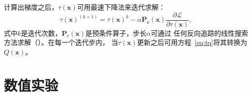 计算出梯度之后，$\tau(\mathbf{x})$可用最速下降法来迭代求解：
\begin{equation}
    \tau(\mathbf{x})^{(k+1)}=\tau(\mathbf{x})^k-\alpha \mathbf{P_c}(\mathbf{x})
    \frac{\partial \mathcal{L}}{\partial \tau(\mathbf{x})},
\end{equation}
式中$k$是迭代次数，$\mathbf{P}_c(\mathbf{x})$是预条件算子，步长$\alpha$可通过
任何反向追踪的线性搜索方法求解（）。在每一个迭代步内，
当$\tau(\mathbf{x})$更新之后可用方程~\ref{eq:tq}将其转换为$Q(\mathbf{x})$。




\vspace{0.5cm}
\section{数值实验}

